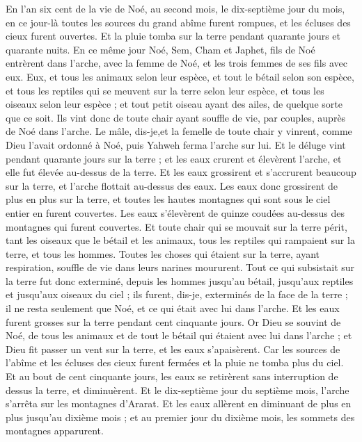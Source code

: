 \begin{multicols}{2}
En l'an six cent de la vie de Noé, au second mois, le dix-septième jour du mois, en ce jour-là toutes les sources du grand abîme furent rompues, et les écluses des cieux furent ouvertes.
Et la pluie tomba sur la terre pendant quarante jours et quarante nuits.
En ce même jour Noé, Sem, Cham et Japhet, fils de Noé entrèrent dans l'arche, avec la femme de Noé, et les trois femmes de ses fils avec eux.
Eux, et tous les animaux selon leur espèce, et tout le bétail selon son espèce, et tous les reptiles qui se meuvent sur la terre selon leur espèce, et tous les oiseaux selon leur espèce ; et tout petit oiseau ayant des ailes, de quelque sorte que ce soit.
Ils vint donc de toute chair ayant souffle de vie, par couples, auprès de Noé dans l'arche. 
Le mâle, dis-je,et la femelle de toute chair y vinrent, comme Dieu l'avait ordonné à Noé, puis Yahweh ferma l'arche sur lui.
Et le déluge vint pendant quarante jours sur la terre ; et les eaux crurent et élevèrent l'arche, et elle fut élevée au-dessus de la terre.
Et les eaux grossirent et s'accrurent beaucoup sur la terre, et l'arche flottait au-dessus des eaux.
Les eaux donc grossirent de plus en plus sur la terre, et toutes les hautes montagnes qui sont sous le ciel entier en furent couvertes.
Les eaux s'élevèrent de quinze coudées au-dessus des montagnes qui furent couvertes.
Et toute chair qui se mouvait sur la terre périt, tant les oiseaux que le bétail et les animaux, tous les reptiles qui rampaient sur la terre, et tous les hommes.
Toutes les choses qui étaient sur la terre, ayant respiration, souffle de vie dans leurs narines moururent.
Tout ce qui subsistait sur la terre fut donc exterminé, depuis les hommes jusqu'au bétail, jusqu'aux reptiles et jusqu'aux oiseaux du ciel ; ils furent, dis-je, exterminés de la face de la terre ; il ne resta seulement que Noé, et ce qui était avec lui dans l'arche.
Et les eaux furent grosses sur la terre pendant cent cinquante jours.
\VerseOne{}Or Dieu se souvint de Noé, de tous les animaux et de tout le bétail qui étaient avec lui dans l'arche ; et Dieu fit passer un vent sur la terre, et les eaux s'apaisèrent.
Car les sources de l'abîme et les écluses des cieux furent fermées et la pluie ne tomba plus du ciel.
Et au bout de cent cinquante jours, les eaux se retirèrent sans interruption de dessus la terre, et diminuèrent.
Et le dix-septième jour du septième mois, l'arche s'arrêta sur les montagnes d'Ararat.
Et les eaux allèrent en diminuant de plus en plus jusqu'au dixième mois ; et au premier jour du dixième mois, les sommets des montagnes apparurent.

\end{multicols}
